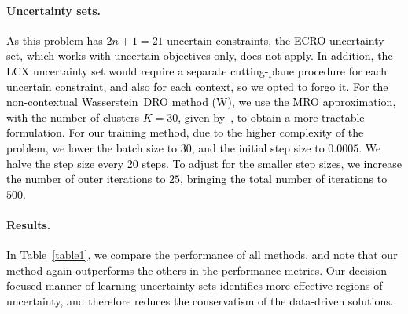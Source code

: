 \documentclass[11pt]{article}
\newcommand{\RC}[1]{\textcolor{black}{#1}}
\begin{document}
\paragraph{Uncertainty sets.}
\RC{As this problem has $2n+1 = 21$ uncertain constraints, the ECRO uncertainty set, which works with uncertain objectives only, does not apply. In addition, the LCX uncertainty set would require a separate cutting-plane procedure for each uncertain constraint, and also for each context, so we opted to forgo it. 
For the non-contextual Wasserstein~\gls{DRO} method (W), we use the \gls{MRO} approximation, with the number of clusters $K=30$, given by~\cite{mro}, to obtain a more tractable formulation. 
For our training method, due to the higher complexity of the problem, we lower the batch size to 30, and the initial step size to $0.0005$. We halve the step size every $20$ steps. To adjust for the smaller step sizes, we increase the number of outer iterations to $25$, bringing the total number of iterations to $500$.}

\paragraph{Results.}
\RC{In Table~\ref{table1}, we compare the performance of all methods, and note that our method again outperforms the others in the performance metrics. Our decision-focused manner of learning uncertainty sets identifies more effective regions of uncertainty, and therefore reduces the conservatism of the data-driven solutions.}
\begin{table}[ht]
  \centering
  \vspace{-0.3em}
  \fontsize{9}{11}\selectfont
		\caption{Average inventory management performance over 10 runs. Values shown as mean $\pm$ half-IQR. The best value for each category is in bold.}
		\label{table1}
        \vspace{-0.7em}
	\end{table}
\end{document}
